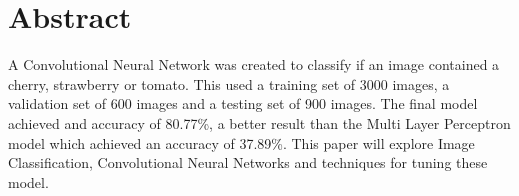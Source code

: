 \documentclass[../main.tex]{subfiles}
\begin{document}
\section{Abstract}

A Convolutional Neural Network was created to classify if an image contained a cherry, strawberry or tomato. This used a training set of 3000 images, a validation set of 600 images and a testing set of 900 images. The final model achieved and accuracy of 80.77\%, a better result than the Multi Layer Perceptron model which achieved an accuracy of 37.89\%. This paper will explore Image Classification, Convolutional Neural Networks and techniques for tuning these model. 
\end{document}

